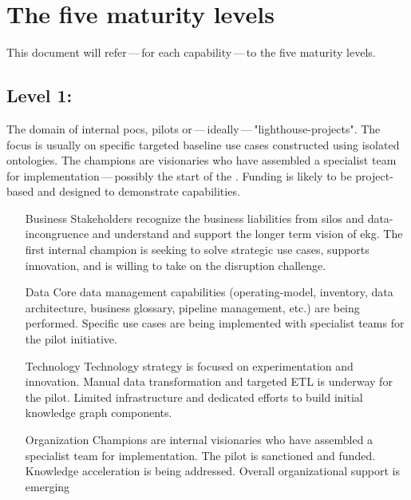 \section{The five maturity levels}\label{sec:the-five-maturity-levels}

This document will refer\,---\,for each capability\,---\,to the five maturity levels.

\subsection{Level 1: \ekgmmLevelOneLabel}

The domain of internal \glspl{poc}, pilots or\,---\,ideally\,---\,"\glspl{lighthouse-project}".
The focus is usually on specific targeted baseline use cases constructed using isolated ontologies.
The champions are visionaries who have assembled a specialist team for implementation\,---\,possibly the
start of the .
Funding is likely to be project-based and designed to demonstrate capabilities.

\begin{itemize}[leftmargin=1in,font=\bfseries]

    \item[Business]     Stakeholders recognize the business liabilities from silos and \gls{data-incongruence} and
                        understand and support the longer term vision of \gls{ekg}.
                        The first internal champion is seeking to solve strategic use cases, supports innovation,
                        and is willing to take on the disruption challenge.
    \item[Data]         Core data management capabilities (\gls{operating-model}, inventory, data architecture,
                        business glossary, pipeline management, etc.) are being performed.
                        Specific use cases are being implemented with specialist teams for the pilot initiative.
    \item[Technology]   Technology strategy is focused on experimentation and innovation.
                        Manual data transformation and targeted ETL is underway for the pilot.
                        Limited infrastructure and dedicated efforts to build initial knowledge graph components.
    \item[Organization] Champions are internal visionaries who have assembled a specialist team for implementation.
                        The pilot is sanctioned and funded.
                        Knowledge acceleration is being addressed.
                        Overall organizational support is emerging
\end{itemize}


